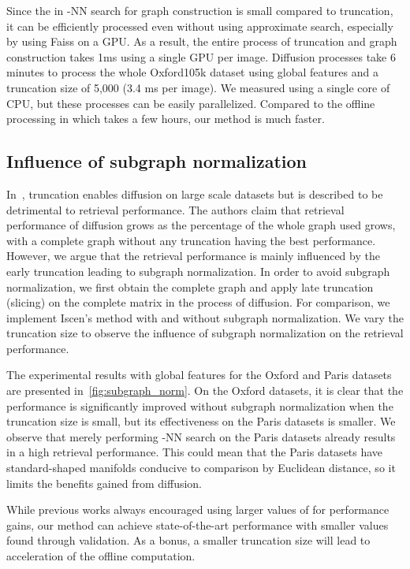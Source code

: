 \documentclass[letterpaper]{article} \usepackage{aaai19}  \usepackage{times}  \usepackage{helvet}  \usepackage{courier}  \usepackage{url}  \usepackage{graphicx}  \frenchspacing  \setlength{\pdfpagewidth}{8.5in}  \setlength{\pdfpageheight}{11in}
\begin{document}
Since the  in -NN search for graph construction is small compared to truncation, it can be efficiently processed even without using approximate search, especially by using Faiss on a GPU.
As a result, the entire process of truncation and graph construction takes 1ms using a single GPU per image.
Diffusion processes take 6 minutes to process the whole Oxford105k dataset using global features and a truncation size of 5,000 (3.4 ms per image).
We measured using a single core of CPU, but these processes can be easily parallelized.
Compared to the offline processing in \cite{iscen2018fast} which takes a few hours, our method is much faster.


\subsection{Influence of subgraph normalization}

In~\cite{iscen2017efficient}, truncation enables diffusion on large scale datasets but is described to be detrimental to retrieval performance.
The authors claim that retrieval performance of diffusion grows as the percentage of the whole graph used grows, with a complete graph without any truncation having the best performance.
However, we argue that the retrieval performance is mainly influenced by the early truncation leading to subgraph normalization.
In order to avoid subgraph normalization, we first obtain the complete graph and apply late truncation (slicing) on the complete matrix  in the process of diffusion.
For comparison, we implement Iscen's method with and without subgraph normalization.
We vary the truncation size  to observe the influence of subgraph normalization on the retrieval performance.

The experimental results with global features for the Oxford and Paris datasets are presented in~\cref{fig:subgraph_norm}.
On the Oxford datasets, it is clear that the performance is significantly improved without subgraph normalization when the truncation size  is small, but its effectiveness on the Paris datasets is smaller.
We observe that merely performing -NN search on the Paris datasets already results in a high retrieval performance.
This could mean that the Paris datasets have standard-shaped manifolds conducive to comparison by Euclidean distance, so it limits the benefits gained from diffusion.


While previous works always encouraged using larger values of  for performance gains, our method can achieve state-of-the-art performance with smaller  values found through validation.
As a bonus, a smaller truncation size  will lead to acceleration of the offline computation.
\end{document}
